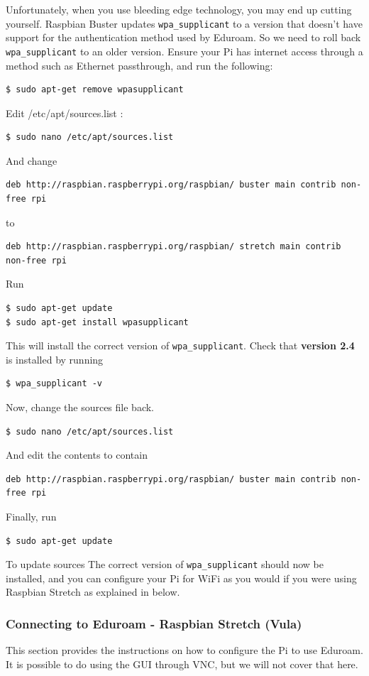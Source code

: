 Unfortunately, when you use bleeding edge technology, you may end up cutting yourself. 
Raspbian Buster updates \verb|wpa_supplicant| to a version that doesn't have support for the authentication method used by Eduroam. So we need to roll back \verb|wpa_supplicant| to an older version. Ensure your Pi has internet access through a method such as Ethernet passthrough, and run the following:
\begin{lstlisting}
$ sudo apt-get remove wpasupplicant
\end{lstlisting}
Edit  /etc/apt/sources.list :
\begin{lstlisting}
$ sudo nano /etc/apt/sources.list
\end{lstlisting}
And change 
\begin{lstlisting}
deb http://raspbian.raspberrypi.org/raspbian/ buster main contrib non-free rpi
\end{lstlisting}
to 
\begin{lstlisting}
deb http://raspbian.raspberrypi.org/raspbian/ stretch main contrib non-free rpi
\end{lstlisting}
Run 
\begin{lstlisting}
$ sudo apt-get update
$ sudo apt-get install wpasupplicant
\end{lstlisting}
This will install the correct version of \verb|wpa_supplicant|. Check that \textbf{version 2.4} is installed by running
\begin{lstlisting}
$ wpa_supplicant -v
\end{lstlisting}
Now, change the sources file back.
\begin{lstlisting}
$ sudo nano /etc/apt/sources.list
\end{lstlisting}
And edit the contents to contain 
\begin{lstlisting}
deb http://raspbian.raspberrypi.org/raspbian/ buster main contrib non-free rpi
\end{lstlisting}
Finally, run 
\begin{lstlisting}
$ sudo apt-get update
\end{lstlisting}
To update sources
The correct version of \verb|wpa_supplicant| should now be installed, and you can configure your Pi for WiFi as you would if you were using Raspbian Stretch as explained in below.


\subsubsection{Connecting to Eduroam - Raspbian Stretch (Vula)}
This section provides the instructions on how to configure the Pi to use Eduroam. It is possible to do using the GUI through VNC, but we will not cover that here.

